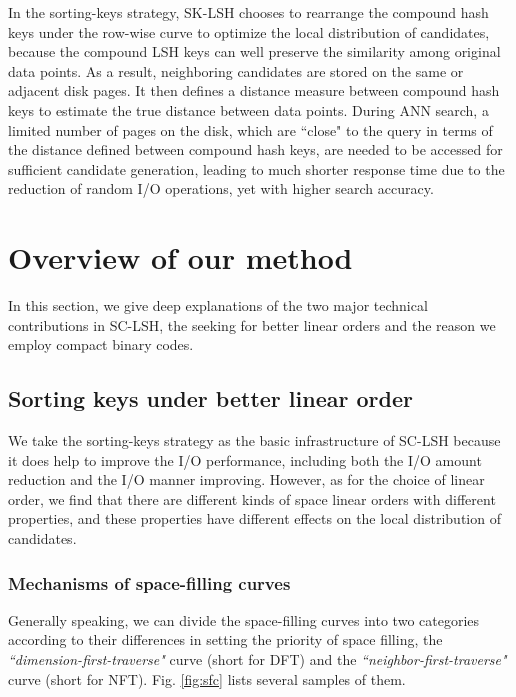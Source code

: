 \documentclass[twocolumn]{svjour3}          %
\begin{document}
In the sorting-keys strategy, SK-LSH chooses to rearrange the compound hash keys under the row-wise curve to optimize the local distribution of candidates, because the compound LSH keys can well preserve the similarity among original data points. As a result, neighboring candidates are stored on the same or adjacent disk pages. It then defines a distance measure between compound hash keys to estimate the true distance between data points. During ANN search, a limited number of pages on the disk, which are ``close" to the query in terms of the distance defined between compound hash keys, are needed to be accessed for sufficient candidate generation, leading to much shorter response time due to the reduction of random I/O operations, yet with higher search accuracy.


\section{Overview of our method}\label{sec:overview}
In this section, we give deep explanations of the two major technical contributions in SC-LSH, the seeking for better linear orders and the reason we employ compact binary codes.

\subsection{Sorting keys under better linear order}\label{subsec:linearorder}
We take the sorting-keys strategy as the basic infrastructure of SC-LSH because it does help to improve the I/O performance, including both the I/O amount reduction and the I/O manner improving.
However, as for the choice of linear order, we find that there are different kinds of space linear orders with different properties, and these properties have different effects on the local distribution of candidates.

\subsubsection{Mechanisms of space-filling curves}
Generally speaking, we can divide the space-filling curves into two categories according to their differences in setting the priority of space filling, the \emph{``dimension-first-traverse"} curve (short for DFT) and the \emph{``neighbor-first-traverse"} curve (short for NFT). Fig. \ref{fig:sfc} lists several samples of them. 
\end{document}
